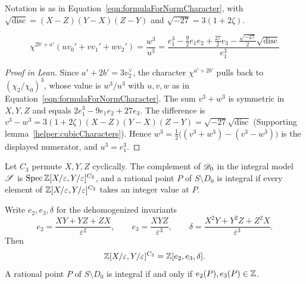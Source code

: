 \begin{equationnode}

\label{eqn:formulaForNormCharacter2}


\leanok

Notation is as in Equation~\ref{eqn:formulaForNormCharacter}, with $\sqrt{\mathrm{disc}}=(X-Z)(Y-X)(Z-Y)$ and $\sqrt{-27}=3(1+2\zeta)$.

\begin{equation*} \chi^{2b'+a'}(uv_0' + vv_1'+wv_2') =\frac{w^3}{u^3} = \frac{e_1^3-\tfrac 92 e_1 e_2+ \tfrac{27}{2} e_3 - \tfrac{\sqrt{-27}}{2} \sqrt{\mathrm{disc}}}{e_1^3} \end{equation*}

\end{equationnode}

\begin{proof}[Proof in Lean]

\leanok


Since $a'+2b'=3v_2^\vee$, the character $\chi^{a'+2b'}$ pulls back to $(\chi_2/\chi_0)^3$, whose value is $w^3/u^3$ with $u,v,w$ as in Equation~\ref{eqn:formulaForNormCharacter}. The sum $v^3+w^3$ is symmetric in $X,Y,Z$ and equals $2e_1^3-9e_1e_2+27e_3$. The difference is $v^3-w^3=3(1+2\zeta)(X-Z)(Y-X)(Z-Y)=\sqrt{-27}\sqrt{\mathrm{disc}}$ (Supporting lemma~\ref{helper:cubicCharacters}). Hence $w^3=\tfrac12\bigl((v^3+w^3)-(v^3-w^3)\bigr)$ is the displayed numerator, and $u^3=e_1^3$.

\end{proof}

\begin{lemma}

\label{lemma:affineIntegrality}


\leanok

Let $C_3$ permute $X,Y,Z$ cyclically. The complement of $\mathscr{D}_0$ in the integral model $\mathscr{S}$ is $\operatorname{Spec}\mathbb{Z}[X/\varepsilon,Y/\varepsilon]^{C_3}$, and a rational point $P$ of $S\setminus D_0$ is integral if every element of $\mathbb{Z}[X/\varepsilon,Y/\varepsilon]^{C_3}$ takes an integer value at $P$.

 Write $e_2,e_3,\delta$ for the dehomogenized invariants \[ e_2=\frac{XY+YZ+ZX}{\varepsilon^2},\qquad e_3=\frac{XYZ}{\varepsilon^3},\qquad \delta=\frac{X^2Y+Y^2Z+Z^2X}{\varepsilon^3}. \] Then \begin{equation*} \mathbb{Z}[X/\varepsilon,Y/\varepsilon]^{C_3} =\mathbb{Z}[e_2,e_3,\delta]. \end{equation*} A rational point $P$ of $S\setminus D_0$ is integral if and only if $e_2(P),e_3(P)\in\mathbb{Z}$. 

\end{lemma}

